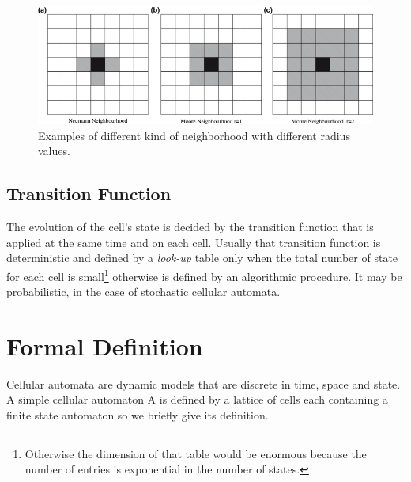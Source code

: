 \begin{figure}
\centering
\caption{Examples of different kind of neighborhood with
different radius values.}\label{mooreNeigh}
\includegraphics[width=1.0\textwidth]{./images/CA_FDM/mooreNeigh}
\end{figure}

\subsection{Transition Function}
The evolution of the cell's state is decided by the transition function that
is applied at the same time and on each cell. Usually that transition function
is deterministic and defined by a \textit{look-up} table only when the total
number of state for each cell is small\footnote{Otherwise the dimension of that table would be enormous because the number of entries is exponential in the number of
states.} otherwise is defined by an algorithmic procedure.
It may be probabilistic, in the case of stochastic cellular automata.

\section{Formal Definition}
Cellular automata are dynamic models that are
discrete in time, space and state. A simple cellular
automaton A is defined by a lattice of cells each containing a finite state
automaton so we briefly give its definition.

